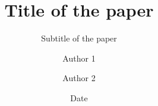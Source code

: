 \documentclass[twoside]{article}
\title{Title of the paper}
\subtitle{Subtitle of the paper} %
\author{Author 1 \and Author 2}
\date{Date}
\begin{document}
\maketitle{}

\cite{notsoshort}

\printbibliography
\end{document}
